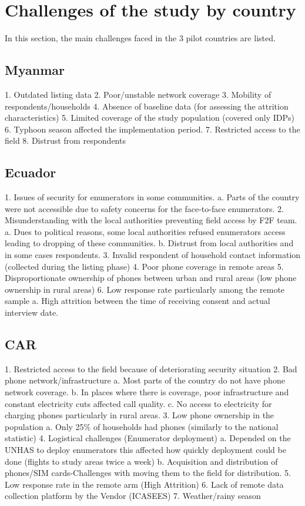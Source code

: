 \documentclass[11pt,harvard]{article}
\begin{document}
\section{Challenges of the study by country}

In this section, the main challenges faced in the 3 pilot countries are listed. 

\subsection{Myanmar}

1.	Outdated listing data
2.	Poor/unstable network coverage
3.	Mobility of respondents/households
4.	Absence of baseline data (for assessing the attrition characteristics) 
5.	Limited coverage of the study population (covered only IDPs)
6.	Typhoon season affected the implementation period.
7.	Restricted access to the field
8.	Distrust from respondents


\subsection{Ecuador}

1.	Issues of security for enumerators in some communities.
		a.	Parts of the country were not accessible due to safety concerns for the face-to-face enumerators.
2.	Misunderstanding with the local authorities preventing field access by F2F team.
		a.	Dues to political reasons, some local authorities refused enumerators access leading to dropping of these communities.
		b.	Distrust from local authorities and in some cases respondents.
3.	Invalid respondent of household contact information (collected during the listing phase)
4.	Poor phone coverage in remote areas
5.	Disproportionate ownership of phones between urban and rural areas (low phone ownership in rural areas)
6.	Low response rate particularly among the remote sample
		a.	High attrition between the time of receiving consent and actual interview date.

\subsection{CAR}

1.	Restricted access to the field because of deteriorating security situation
2.	Bad phone network/infrastructure 
		a.	Most parts of the country do not have phone network coverage.
		b.	In places where there is coverage, poor infrastructure and constant electricity cuts affected call quality.
		c.	No access to electricity for charging phones particularly in rural areas.
3.	Low phone ownership in the population
		a.	Only 25\% of households had phones (similarly to the national statistic)
4.	Logistical challenges (Enumerator deployment)
		a.	Depended on the UNHAS to deploy enumerators this affected how quickly deployment could be done (flights to study areas twice a week)
		b.	Acquisition and distribution of phones/SIM cards-Challenges with moving them to the field for distribution.
5.	Low response rate in the remote arm (High Attrition)
6.	Lack of remote data collection platform by the Vendor (ICASEES) 
7.	Weather/rainy season
\end{document}
